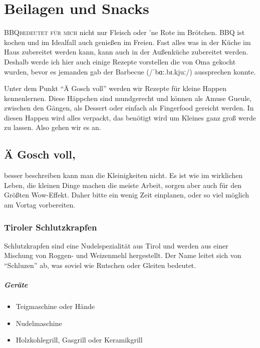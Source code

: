 \chapter{Beilagen und Snacks}\label{Chapter5}
\lettrine[lines=3]{BBQ}{bedeutet für mich} nicht nur Fleisch oder 'ne Rote im Brötchen. BBQ ist kochen und im Idealfall auch genießen im 
Freien. Fast alles was in der Küche im Haus zubereitet werden kann, kann auch in der Außenküche zubereitet werden.  Deshalb werde ich 
hier auch einige Rezepte vorstellen die von Oma gekocht wurden, bevor es jemanden gab der Barbecue (/ˈbɑː.bɪ.kjuː/)  aussprechen konnte.

Unter dem Punkt "`Ä Gosch voll"' werden wir Rezepte für kleine Happen kennenlernen.  Diese Häppchen sind mundgerecht und können als 
Amuse Gueule, 
zwischen den Gängen, als Dessert oder einfach als Fingerfood gereicht werden. In diesen Happen wird alles verpackt, das benötigt wird um 
Kleines ganz groß werde zu 
lassen. Also gehen wir es an.  

\section{Ä Gosch voll,}
besser beschreiben kann man die Kleinigkeiten nicht. Es ist wie im wirklichen Leben, die kleinen Dinge machen die meiste Arbeit, sorgen aber 
auch für den Größten 
Wow-Effekt. Daher bitte ein wenig Zeit einplanen, oder so viel möglich am Vortag vorbereiten. 

\subsection{Tiroler Schlutzkrapfen}

Schlutzkrapfen sind eine Nudelspezialität aus Tirol und werden aus einer 
Mischung von Roggen- und Weizenmehl hergestellt. Der Name leitet sich von 
"`Schluzen"' 
ab, was soviel wie Rutschen oder Gleiten bedeutet.

\paragraph{Geräte}

\begin{itemize}[noitemsep]
	\item Teigmaschine oder Hände
	\item Nudelmaschine
	\item Holzkohlegrill, Gasgrill oder Keramikgrill
\end{itemize}

